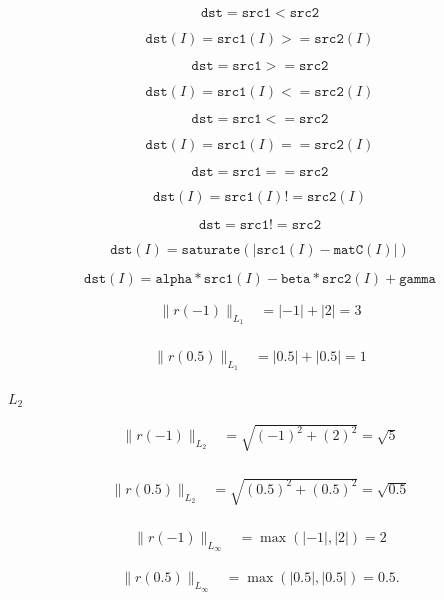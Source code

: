 \documentclass{article}
\begin{document}
\[\texttt{dst} = \texttt{src1} < \texttt{src2}\]
\pagebreak

\[\texttt{dst} (I) = \texttt{src1} (I) >= \texttt{src2} (I)\]
\pagebreak

\[\texttt{dst} = \texttt{src1} >= \texttt{src2}\]
\pagebreak

\[\texttt{dst} (I) = \texttt{src1} (I) <= \texttt{src2} (I)\]
\pagebreak

\[\texttt{dst} = \texttt{src1} <= \texttt{src2}\]
\pagebreak

\[\texttt{dst} (I) = \texttt{src1} (I) == \texttt{src2} (I)\]
\pagebreak

\[\texttt{dst} = \texttt{src1} == \texttt{src2}\]
\pagebreak

\[\texttt{dst} (I) = \texttt{src1} (I) != \texttt{src2} (I)\]
\pagebreak

\[\texttt{dst} = \texttt{src1} != \texttt{src2}\]
\pagebreak

\[\texttt{dst}(I) = \texttt{saturate} (| \texttt{src1}(I) - \texttt{matC}(I)|)\]
\pagebreak

\[\texttt{dst}(I) = \texttt{alpha} * \texttt{src1}(I) - \texttt{beta} * \texttt{src2}(I) + \texttt{gamma} \]
\pagebreak

\begin{align*} \| r(-1) \|_{L_1} &= |-1| + |2| = 3 \\ \end{align*}
\pagebreak

\begin{align*} \| r(0.5) \|_{L_1} &= |0.5| + |0.5| = 1 \\ \end{align*}
\pagebreak

$ L_{2} $
\pagebreak

\begin{align*} \| r(-1) \|_{L_2} &= \sqrt{(-1)^{2} + (2)^{2}} = \sqrt{5} \\ \end{align*}
\pagebreak

\begin{align*} \| r(0.5) \|_{L_2} &= \sqrt{(0.5)^{2} + (0.5)^{2}} = \sqrt{0.5} \\ \end{align*}
\pagebreak

\begin{align*} \| r(-1) \|_{L_\infty} &= \max(|-1|,|2|) = 2 \end{align*}
\pagebreak

\begin{align*} \| r(0.5) \|_{L_\infty} &= \max(|0.5|,|0.5|) = 0.5. \end{align*}
\pagebreak
\end{document}

